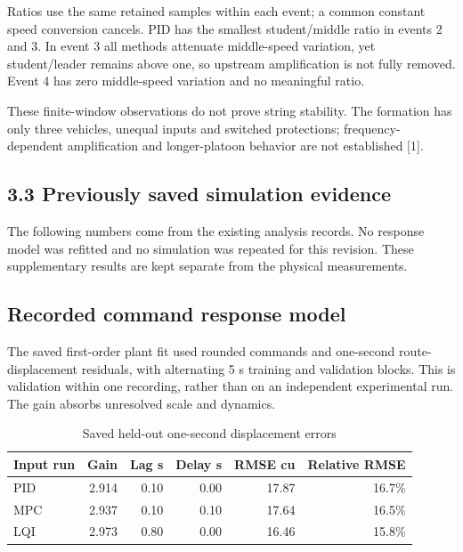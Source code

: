 \documentclass[11pt,a4paper]{article}
\begin{document}
Ratios use the same retained samples within each event; a common constant speed conversion cancels. PID has the smallest student/middle ratio in events 2 and 3. In event 3 all methods attenuate middle-speed variation, yet student/leader remains above one, so upstream amplification is not fully removed. Event 4 has zero middle-speed variation and no meaningful ratio.


These finite-window observations do not prove string stability. The formation has only three vehicles, unequal inputs and switched protections; frequency-dependent amplification and longer-platoon behavior are not established [1].


\newpage

\subsection*{3.3 Previously saved simulation evidence}

The following numbers come from the existing analysis records. No response model was refitted and no simulation was repeated for this revision. These supplementary results are kept separate from the physical measurements.


\subsection*{Recorded command response model}

The saved first-order plant fit used rounded commands and one-second route-displacement residuals, with alternating 5 s training and validation blocks. This is validation within one recording, rather than on an independent experimental run. The gain absorbs unresolved scale and dynamics.


\begin{table}[H]\centering\small\caption{Saved held-out one-second displacement errors}
\begin{tabular}{lrrrrr}
\toprule
Input run & Gain & Lag s & Delay s & RMSE cu & Relative RMSE \\
\midrule

PID & 2.914 & 0.10 & 0.00 & 17.87 & 16.7\% \\

MPC & 2.937 & 0.10 & 0.10 & 17.64 & 16.5\% \\

LQI & 2.973 & 0.80 & 0.00 & 16.46 & 15.8\% \\

\bottomrule\end{tabular}\end{table}
\end{document}
